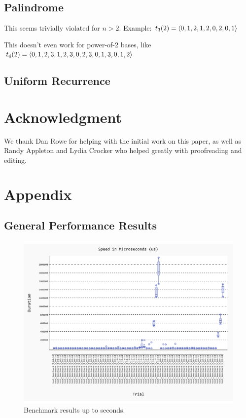 \documentclass[conference]{IEEEtran}
\begin{document}
\subsection{Palindrome}

This seems trivially violated for $n > 2$. Example: $t_3(2) = \langle 0, 1, 2, 1, 2, 0, 2, 0, 1 \rangle$

This doesn't even work for power-of-2 bases, like $t_4(2) = \langle 0, 1, 2, 3, 1, 2, 3, 0, 2, 3, 0, 1, 3, 0, 1, 2 \rangle$


\subsection{Uniform Recurrence}


\section{Acknowledgment}

We thank Dan Rowe for helping with the initial work on this paper, as well as Randy Appleton and Lydia Crocker who helped greatly with proofreading and editing.

\section{Appendix}

\subsection{General Performance Results}

\begin{figure}[H]
    \centering
    \includegraphics[width=\linewidth]{figures/benchmark/20241119_211228.pdf}
    \caption{Benchmark results up to seconds.}
    \label{fig:benchmark_in_s}
\end{figure}
\end{document}
